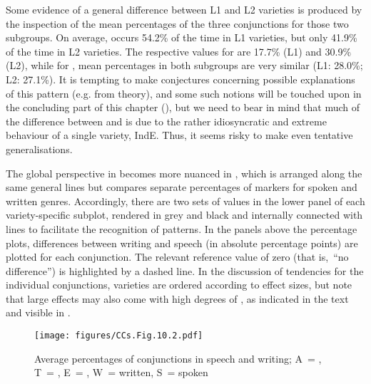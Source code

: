 Some evidence of a general difference between L1 and L2 varieties is produced by the inspection of the mean percentages of the three conjunctions for those two subgroups. On average,  occurs 54.2\% of the time in L1 varieties, but only 41.9\% of the time in L2 varieties. The respective values for  are 17.7\% (L1) and 30.9\% (L2), while for , mean percentages in both subgroups are very similar (L1: 28.0\%; L2: 27.1\%). It is tempting to make conjectures concerning possible explanations of this pattern (e.g. from  theory), and some such notions will be touched upon in the concluding part of this chapter (), but we need to bear in mind that much of the difference between  and  is due to the rather idiosyncratic and extreme behaviour of a single variety, IndE. Thus, it seems risky to make even tentative generalisations.

The global perspective in  becomes more nuanced in , which is arranged along the same general lines but compares separate percentages of markers for spoken and written genres. Accordingly, there are two sets of values in the lower panel of each variety-specific subplot, rendered in grey and black and internally connected with lines to facilitate the recognition of patterns. In the panels above the percentage plots, differences between writing and speech (in absolute percentage points) are plotted for each conjunction. The relevant reference value of zero (that is,~“no difference”) is highlighted by a dashed line. In the discussion of tendencies for the individual conjunctions, varieties are ordered according to effect sizes, but note that large effects may also come with high degrees of , as indicated in the text and visible in .

\begin{figure}
\texttt{[image: figures/CCs.Fig.10.2.pdf]}
\caption{\label{bkm:Ref59897259}\label{fig:10.2}Average percentages of conjunctions in speech and writing; A~= , T~= , E~= , W~= written, S~= spoken}
\end{figure}

